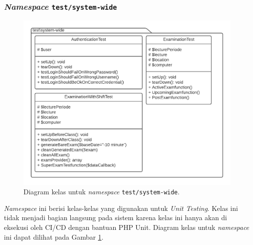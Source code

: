 \subsubsection{\textit{Namespace} \texttt{test/system-wide}}
    \begin{figure}
        \centering
        \includegraphics[width=0.7\paperwidth]{Gambar/classmap-be/Classmap - test-systemwide.pdf}
        \caption{Diagram kelas untuk \textit{namespace} \texttt{test/system-wide}.}
        \label{fig:classmap_test-systemwide}
    \end{figure}
    \textit{Namespace} ini berisi kelas-kelas yang digunakan untuk \textit{Unit Testing}. Kelas
    ini tidak menjadi bagian langsung pada sistem karena kelas ini hanya akan di eksekusi oleh
    CI/CD dengan bantuan PHP Unit. Diagram kelas untuk \textit{namespace} ini dapat dilihat pada 
    Gambar \ref{fig:classmap_test-systemwide}.
    
